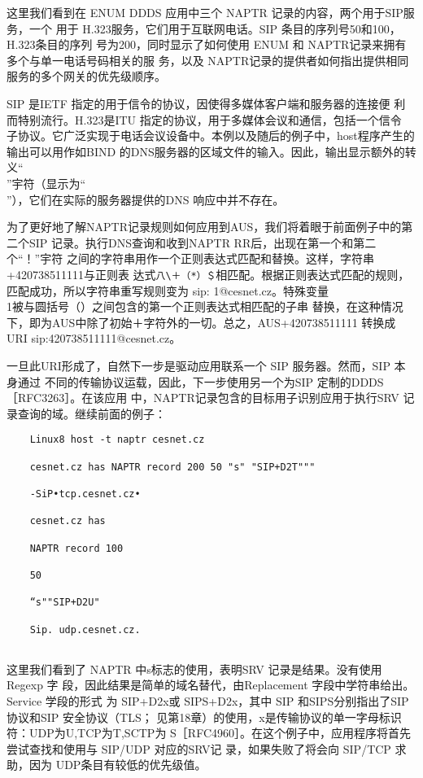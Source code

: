 这里我们看到在 ENUM DDDS 应用中三个 NAPTR 记录的内容，两个用于SIP服务，一个
用于 H.323服务，它们用于互联网电话。SIP 条目的序列号50和100，H.323条目的序列
号为200，同时显示了如何使用 ENUM 和 NAPTR记录来拥有多个与单一电话号码相关的服
务，以及 NAPTR记录的提供者如何指出提供相同服务的多个网关的优先级顺序。

\begin{tcolorbox}
    SIP 是IETF 指定的用于信令的协议，因使得多媒体客户端和服务器的连接便
    利而特别流行。H.323是ITU 指定的协议，用于多媒体会议和通信，包括一个信令
    子协议。它广泛实现于电话会议设备中。本例以及随后的例子中，host程序产生的
    输出可以用作如BIND 的DNS服务器的区域文件的输入。因此，输出显示额外的转
    义“\\”宇符（显示为“\\”），它们在实际的服务器提供的DNS 响应中并不存在。
\end{tcolorbox}

为了更好地了解NAPTR记录规则如何应用到AUS，我们将着眼于前面例子中的第
二个SIP 记录。执行DNS查询和收到NAPTR RR后，出现在第一个和第二个“！”宇符
之间的字符串用作一个正则表达式匹配和替换。这样，字符串+420738511111与正则表
达式\verb|八\＋（*）＄|相匹配。根据正则表达式匹配的规则，匹配成功，所以字符串重写规则变为
sip: 1@cesnet.cz。特殊变量\\1被与圆括号（）之间包含的第一个正则表达式相匹配的子串
替换，在这种情况下，即为AUS中除了初始＋字符外的一切。总之，AUS+420738511111
转换成 URI sip:420738511111@cesnet.cz。

一旦此URI形成了，自然下一步是驱动应用联系一个 SIP 服务器。然而，SIP 本身通过
不同的传输协议运载，因此，下一步使用另一个为SIP 定制的DDDS［RFC3263］。在该应用
中，NAPTR记录包含的目标用子识别应用于执行SRV 记录查询的域。继续前面的例子：

\begin{verbatim}
    Linux8 host -t naptr cesnet.cz
    
    cesnet.cz has NAPTR record 200 50 "s" "SIP+D2T"""
    
    -SiP•tcp.cesnet.cz•
    
    cesnet.cz has
    
    NAPTR record 100
    
    50
    
    “s""SIP+D2U"
    
    Sip. udp.cesnet.cz.
    
\end{verbatim}

这里我们看到了 NAPTR 中s标志的使用，表明SRV 记录是结果。没有使用 Regexp 字
段，因此结果是简单的域名替代，由Replacement 字段中学符串给出。Service 学段的形式
为 SIP+D2x或 SIPS+D2x，其中 SIP 和SIPS分别指出了SIP 协议和SIP 安全协议（TLS；
见第18章）的使用，x是传输协议的单一字母标识符：UDP为U,TCP为T,SCTP为
S［RFC4960］。在这个例子中，应用程序将首先尝试查找和使用与 SIP/UDP 对应的SRV记
录，如果失败了将会向 SIP/TCP 求助，因为 UDP条目有较低的优先级值。

